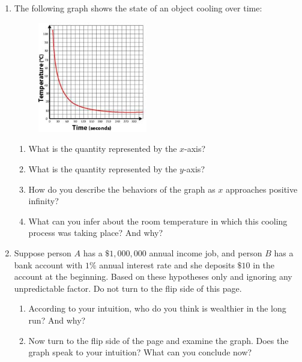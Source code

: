 \documentclass[twoside, 10pt]{article}
\begin{document}
\begin{enumerate}[leftmargin=*]
\item
The following graph shows the state of an object cooling over time:
\begin{figure}[h]
\includegraphics[width=0.45\textwidth]{cooling-law.jpg}
\end{figure}
\begin{enumerate}
\item
What is the quantity represented by the $x$-axis?
\item 
What is the quantity represented by the $y$-axis?
\item 
How do you describe the behaviors of the graph as $x$ approaches positive infinity?
\item
What can you infer about the room temperature in which this cooling process was taking place? And why?
\end{enumerate}
\item
Suppose person $A$ has a $\$1,000,000$ annual income job, and person $B$ has a bank account with $1\%$ annual interest rate and she deposits $\$10$ in the account at the beginning. Based on these hypotheses only and ignoring any unpredictable factor. Do not turn to the flip side of this page.
\begin{enumerate}
\item
According to your intuition, who do you think is wealthier in the long run? And why?
\item Now turn to the flip side of the page and examine the graph. Does the graph speak to your intuition? What can you conclude now?
\clearpage
{}


\end{enumerate}
\end{enumerate}
\end{document}
